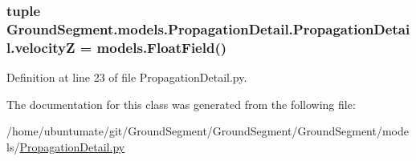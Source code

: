 \subsubsection[{velocity\+Z}]{\setlength{\rightskip}{0pt plus 5cm}tuple Ground\+Segment.\+models.\+Propagation\+Detail.\+Propagation\+Detail.\+velocity\+Z = models.\+Float\+Field()\hspace{0.3cm}{\ttfamily [static]}}\label{class_ground_segment_1_1models_1_1_propagation_detail_1_1_propagation_detail_ac562c9a45f93f8f9d46f7aa89adaf569}


Definition at line 23 of file Propagation\+Detail.\+py.



The documentation for this class was generated from the following file\+:\begin{DoxyCompactItemize}
\item 
/home/ubuntumate/git/\+Ground\+Segment/\+Ground\+Segment/\+Ground\+Segment/models/\hyperlink{_propagation_detail_8py}{Propagation\+Detail.\+py}\end{DoxyCompactItemize}
